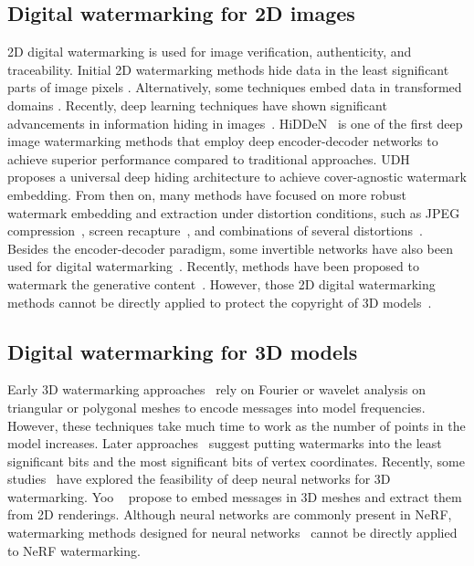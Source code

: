\subsection{Digital watermarking for 2D images} 
2D digital watermarking is used for image verification, authenticity, and traceability. Initial 2D watermarking methods hide data in the least significant parts of image pixels \cite{413536}. Alternatively, some techniques embed data in transformed domains \cite{lai2010digital, kang2010efficient, wang2022dtcwt}. Recently, deep learning techniques have shown significant advancements in information hiding in images~\cite{zhu2018hidden, baluja2019hiding, jing2021hinet, ying2022rwn, zeng2023watermarks}. HiDDeN~\cite{zhu2018hidden} is one of the first deep image watermarking methods that employ deep encoder-decoder networks to achieve superior performance compared to traditional approaches. UDH~\cite{zhang2020udh} proposes a universal deep hiding architecture to achieve cover-agnostic watermark embedding. From then on, many methods have focused on more robust watermark embedding and extraction under distortion conditions, such as JPEG compression~\cite{jia2021mbrs}, screen recapture~\cite{fang2018screen, fang2022pimog, fang2023denol, liu2023wrap}, and combinations of several distortions~\cite{luo2020distortion}. Besides the encoder-decoder paradigm, some invertible networks have also been used for digital watermarking~\cite{guan2022deepmih, fang2023flow}. Recently, methods have been proposed to watermark the generative content~\cite{fernandez2023stable}. However, those 2D digital watermarking methods cannot be directly applied to protect the copyright of 3D models~\cite{luo2023copyrnerf}.

\subsection{Digital watermarking for 3D models}
Early 3D watermarking approaches~\cite{ohbuchi2002frequency, son2017perceptual, al2019graph} rely on Fourier or wavelet analysis on triangular or polygonal meshes to encode messages into model frequencies. However, these techniques take much time to work as the number of points in the model increases. Later approaches~\cite{zhou2018distortion, jiang2017reversible, tsai2022integrating, hou2023separable} suggest putting watermarks into the least significant bits and the most significant bits of vertex coordinates. Recently, some studies~\cite{wang2022neural, wang2022deep, zhu2024rethinking} have explored the feasibility of deep neural networks for 3D watermarking. Yoo \etal~\cite{Yoo_2022_CVPR} propose to embed messages in 3D meshes and extract them from 2D renderings. Although neural networks are commonly present in NeRF, watermarking methods designed for neural networks~\cite{zhang2024robust, tan2023deep, zeng2023watermarks, wu2020watermarking} cannot be directly applied to NeRF watermarking.

